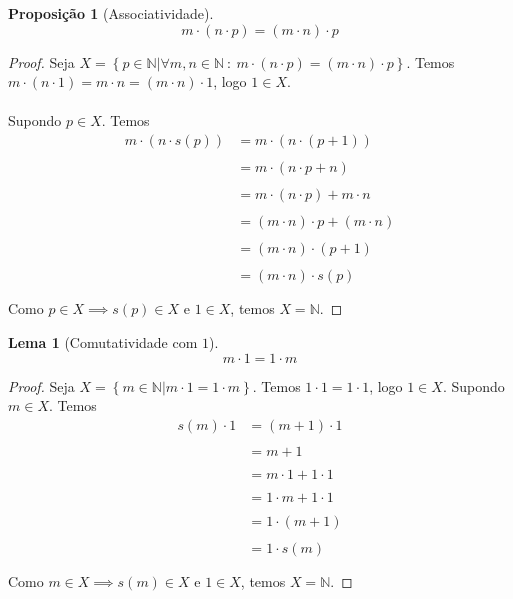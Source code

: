\documentclass{article}
\theoremstyle{plain}
\newtheorem{prop}{Proposição}[section]
\newtheorem{lema}{Lema}
\theoremstyle{definition}
\theoremstyle{remark}
\begin{document}
\begin{prop}[Associatividade]
	$$m\cdot(n\cdot p) = (m\cdot n ) \cdot p$$
\end{prop}
\begin{proof}
	Seja $X = \left\{p \in \mathbb{N} | \forall m,n \in \mathbb{N} \: : \:  m\cdot( n\cdot p) = (m\cdot n )\cdot p \right\}$. Temos $m\cdot (n\cdot1) = m\cdot n = (m\cdot n ) \cdot 1$, logo $1\in X$. \\ ~\\ Supondo $p\in X$. Temos 
	 \begin{align*}
		 m\cdot (n\cdot s(p)) &= m\cdot(n\cdot ( p+1) )  \\~\\
		 &= m\cdot ( n\cdot p + n) \\~\\
		 &= m\cdot ( n\cdot p) + m\cdot n \\~\\
		 &= (m\cdot  n)\cdot p + (m\cdot n) \\~\\
		 &= (m\cdot  n)\cdot (p+1) \\~\\
		 &= (m\cdot  n)\cdot s(p) \\~\\
	\end{align*}
	Como $p\in X\implies s(p) \in X $ e $1\in X$, temos $X = \mathbb{N}$.
\end{proof}
\begin{lema}[Comutatividade com $1$]
	\label{comutatividade1}
	$$m\cdot 1 = 1 \cdot m $$
\end{lema}
\begin{proof}
	Seja $X = \left\{m \in \mathbb{N} |  m\cdot 1 = 1\cdot m  \right\}$. Temos $1\cdot 1 = 1\cdot 1  $, logo $1\in X$. Supondo $m\in X$. Temos 
	 \begin{align*}
		 s(m)\cdot 1 &= (m+1)\cdot 1   \\~\\
		 &= m+1  \\~\\
		 &= m\cdot 1 + 1\cdot1  \\~\\
		 &= 1\cdot m +1\cdot 1   \\~\\
		 &=1\cdot (m+1)   \\~\\
		 &=1\cdot s(m)   \\~\\
	\end{align*}
	Como $m\in X\implies s(m) \in X $ e $1\in X$, temos $X = \mathbb{N}$.
\end{proof}
\end{document}
